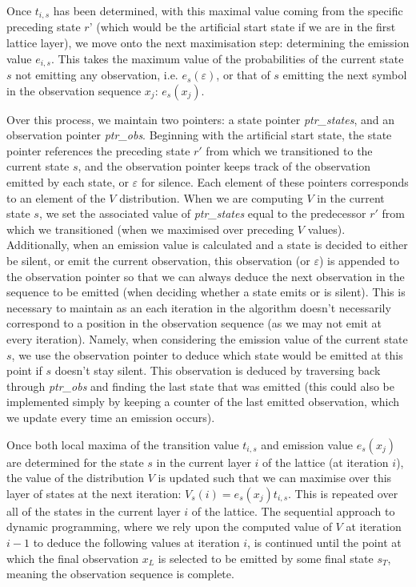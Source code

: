 \documentclass[a4paper, 11pt]{article}
\begin{document}
	Once $t_{i, s}$ has been determined, with this maximal value coming from the specific preceding state $r’$ (which would be the artificial start state if we are in the first lattice layer), we move onto the next maximisation step: determining the emission value $e_{i, s}$. This takes the maximum value of the probabilities of the current state $s$ not emitting any observation, i.e. $e_{s} \left(\varepsilon \right)$, or that of $s$ emitting the next symbol in the observation sequence $x_{j}$: $e_{s} \left(x_{j} \right)$. 
	
	Over this process, we maintain two pointers: a state pointer \emph{ptr\_states}, and an observation pointer \emph{ptr\_obs}. Beginning with the artificial start state, the state pointer references the preceding state $r'$ from which we transitioned to the current state $s$, and the observation pointer keeps track of the observation emitted by each state, or $\varepsilon$ for silence. Each element of these pointers corresponds to an element of the $V$ distribution. When we are computing $V$ in the current state $s$, we set the associated value of \emph{ptr\_states} equal to the predecessor $r'$ from which we transitioned (when we maximised over preceding $V$ values). Additionally, when an emission value is calculated and a state is decided to either be silent, or emit the current observation, this observation (or $\varepsilon$) is appended to the observation pointer so that we can always deduce the next observation in the sequence to be emitted (when deciding whether a state emits or is silent). This is necessary to maintain as an each iteration in the algorithm doesn't necessarily correspond to a position in the observation sequence (as we may not emit at every iteration). Namely, when considering the emission value of the current state $s$, we use the observation pointer to deduce which state would be emitted at this point if $s$ doesn’t stay silent. This observation is deduced by traversing back through \emph{ptr\_obs} and finding the last state that was emitted (this could also be implemented simply by keeping a counter of the last emitted observation, which we update every time an emission occurs).

	Once both local maxima of the transition value $t_{i, s}$ and emission value $e_{s} \left(x_{j} \right)$ are determined for the state $s$ in the current layer $i$ of the lattice (at iteration $i$), the value of the distribution $V$ is updated such that we can maximise over this layer of states at the next iteration: $V_{s}\left(i \right) = e_{s} \left(x_{j} \right) t_{i, s}$. This is repeated over all of the states in the current layer $i$ of the lattice. The sequential approach to dynamic programming, where we rely upon the computed value of $V$ at iteration $i-1$ to deduce the following values at iteration $i$, is continued until the point at which the final observation $x_{L}$ is selected to be emitted by some final state $s_{T}$, meaning the observation sequence is complete.
	
\end{document}
